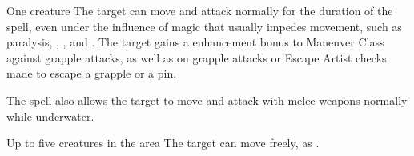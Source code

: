 \begin{spellheader}
    \spellrng{\rngtouch}
    \spelldur{\durshort}
\end{spellheader}
\begin{spelleffects}
    \begin{spelltarget}{One creature}
        \spelleffect The target can move and attack normally for the duration of the spell, even under the influence of magic that usually impedes movement, such as paralysis, , , and . The target gains a  enhancement bonus to Maneuver Class against grapple attacks, as well as on grapple attacks or Escape Artist checks made to escape a grapple or a pin.
        \par The spell also allows the target to move and attack with melee weapons normally while underwater.
    \end{spelltarget}
\end{spelleffects}

\begin{spellheader}
\end{spellheader}
\begin{spelleffects}
    \begin{spelltargets}{Up to five creatures in the area}
        \spelleffect The target can move freely, as .
    \end{spelltargets}
\end{spelleffects}

\begin{comment}
\subsubsection{G}
\end{comment}

